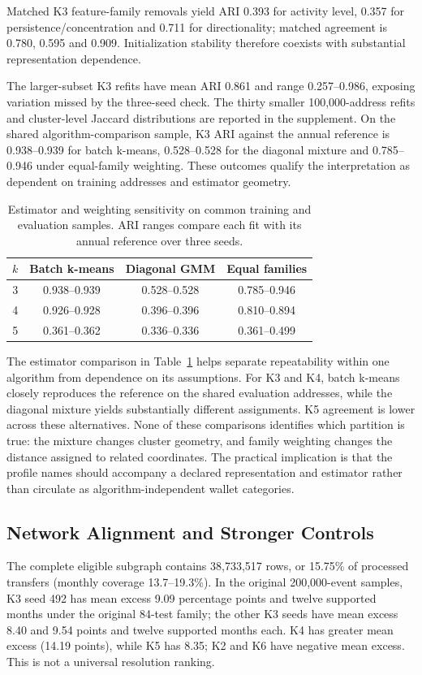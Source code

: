 \documentclass[journal,letterpaper]{IEEEtran}
\begin{document}
Matched K3 feature-family removals yield ARI 0.393 for activity level, 0.357 for persistence/concentration and 0.711 for directionality; matched agreement is 0.780, 0.595 and 0.909. Initialization stability therefore coexists with substantial representation dependence.

The larger-subset K3 refits have mean ARI 0.861 and range 0.257--0.986, exposing variation missed by the three-seed check. The thirty smaller 100,000-address refits and cluster-level Jaccard distributions are reported in the supplement. On the shared algorithm-comparison sample, K3 ARI against the annual reference is 0.938--0.939 for batch k-means, 0.528--0.528 for the diagonal mixture and 0.785--0.946 under equal-family weighting. These outcomes qualify the interpretation as dependent on training addresses and estimator geometry.

\begin{table}[t]
\centering\footnotesize
\caption{Estimator and weighting sensitivity on common training and evaluation samples. ARI ranges compare each fit with its annual reference over three seeds.}
\label{tab:estimatorcomparison}
\begin{tabular}{rccc}
\toprule
$k$ & Batch k-means & Diagonal GMM & Equal families \\
\midrule
3 & 0.938--0.939 & 0.528--0.528 & 0.785--0.946 \\
4 & 0.926--0.928 & 0.396--0.396 & 0.810--0.894 \\
5 & 0.361--0.362 & 0.336--0.336 & 0.361--0.499 \\
\bottomrule
\end{tabular}
\end{table}

The estimator comparison in Table~\ref{tab:estimatorcomparison} helps separate repeatability within one algorithm from dependence on its assumptions. For K3 and K4, batch k-means closely reproduces the reference on the shared evaluation addresses, while the diagonal mixture yields substantially different assignments. K5 agreement is lower across these alternatives. None of these comparisons identifies which partition is true: the mixture changes cluster geometry, and family weighting changes the distance assigned to related coordinates. The practical implication is that the profile names should accompany a declared representation and estimator rather than circulate as algorithm-independent wallet categories.

\subsection{Network Alignment and Stronger Controls}
The complete eligible subgraph contains 38,733,517 rows, or 15.75\% of processed transfers (monthly coverage 13.7--19.3\%). In the original 200,000-event samples, K3 seed 492 has mean excess 9.09 percentage points and twelve supported months under the original 84-test family; the other K3 seeds have mean excess 8.40 and 9.54 points and twelve supported months each. K4 has greater mean excess (14.19 points), while K5 has 8.35; K2 and K6 have negative mean excess. This is not a universal resolution ranking.
\end{document}
